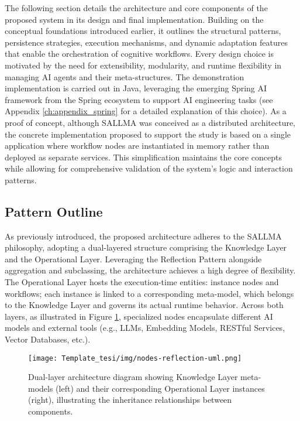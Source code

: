 The following section details the architecture and core components of the proposed system in its design and final implementation. Building on the conceptual foundations introduced earlier, it outlines the structural patterns, persistence strategies, execution mechanisms, and dynamic adaptation features that enable the orchestration of cognitive workflows. Every design choice is motivated by the need for extensibility, modularity, and runtime flexibility in managing AI agents and their meta-structures. The demonstration implementation is carried out in Java, leveraging the emerging Spring AI framework from the Spring ecosystem to support AI engineering tasks (see Appendix \ref{ch:appendix_spring} for a detailed explanation of this choice). As a proof of concept, although SALLMA was conceived as a distributed architecture, the concrete implementation proposed to support the study is based on a single application where workflow nodes are instantiated in memory rather than deployed as separate services. This simplification maintains the core concepts while allowing for comprehensive validation of the system's logic and interaction patterns.






\subsection{Pattern Outline}


As previously introduced, the proposed architecture adheres to the SALLMA philosophy, adopting a dual-layered structure comprising the Knowledge Layer and the Operational Layer. Leveraging the Reflection Pattern alongside aggregation and subclassing, the architecture achieves a high degree of flexibility.
The Operational Layer hosts the execution-time entities: instance nodes and workflows; each instance is linked to a corresponding meta-model, which belongs to the Knowledge Layer and governs its actual runtime behavior. Across both layers, as illustrated in Figure \ref{fig:nodes-reflection-uml}, specialized nodes encapsulate different AI models and external tools (e.g., LLMs, Embedding Models, RESTful Services, Vector Databases, etc.).

\begin{figure}[h]
    \centering
    \texttt{[image: Template\_tesi/img/nodes-reflection-uml.png]}
    \caption{Dual-layer architecture diagram showing Knowledge Layer meta-models (left) and their corresponding Operational Layer instances (right), illustrating the inheritance relationships between components.}
    \label{fig:nodes-reflection-uml}
\end{figure}


